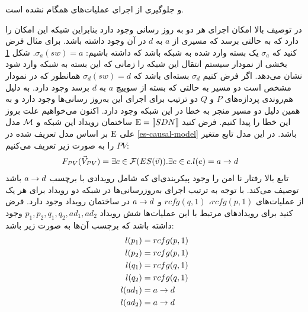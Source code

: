 و جلوگیری از اجرای عملیات‌های همگام نشده است.
\begin{figure}
    \centering
    \caption{}
    \label{fig:blacklist:lts}
\end{figure}
در توصیف بالا امکان اجرای هر دو به روز رسانی وجود دارد
بنابراین شبکه این امکان را دارد که به حالتی برسد که مسیری از 
$a$
به
$d$
در آن وجود داشته باشد.
برای مثال فرض کنید که
$\sigma_a$
یک بسته وارد شده به شبکه باشد که داشته باشیم:
$\sigma_a(sw) = a$.
شکل
\ref{fig:blacklist:lts}
بخشی از نمودار سیستم انتقال این شبکه را زمانی که این بسته به شبکه وارد شود نشان می‌دهد.
اگر فرض کنیم
$\sigma_d$
بسته‌ای باشد که
$\sigma_d(sw) = d$
همانطور که در نمودار مشخص است دو مسیر به حالتی که بسته از سوییچ
$a$
به
$d$
برسد وجود دارد.
به دلیل هم‌روندی پردازه‌های
$P$
و
$Q$
دو ترتیب برای اجرای این به‌روز رسانی‌ها وجود دارد و به همین دلیل دو مسیر منجر به خطا در این شبکه وجود دارد.
اکنون می‌خواهیم علت بروز این خطا را پیدا کنیم.
فرض کنید
$\mathrm{E} = \llbracket SDN \rrbracket$
ساختمان رویداد این شبکه و
$\mathcal{M}$
مدل علی
$\mathrm{E}$
بر اساس مدل تعریف شده در
\ref{es-causal-model}
باشد.
در این مدل تابع متغیر
$PV$
را به صورت زیر تعریف می‌کنیم:
\begin{align*}
    F_{PV}(\vec V_{PV}) & = \exists c \in \mathcal{F}(ES(\vec v)). \exists e \in c. l(e) = a\rightarrow d
\end{align*}
تابع بالا رفتار نا امن را وجود پیکربندی‌ای که شامل رویدادی با برچسب 
$a \rightarrow d$
باشد توصیف می‌کند.
با توجه به ترتیب اجرای به‌روز‌رسانی‌ها در شبکه دو رویداد برای هر یک از عملیات‌های
$rcfg(p,1)$،
$rcfg(q,1)$
و
$a \rightarrow d$
در ساختمان رویداد وجود دارد.
فرض کنید برای رویداد‌های مرتبط با این عملیات‌ها شش رویداد
$p_1,p_2,q_1,q_2,ad_1,ad_2$
وجود داشته باشد که برچسب آن‌ها به صورت زیر باشد:
\begin{align*}
    l(p_1) & = rcfg(p,1) \\
    l(p_2) & = rcfg(p,1) \\
    l(q_1) & = rcfg(q,1) \\
    l(q_2) & = rcfg(q,1) \\
    l(ad_1) & = a \rightarrow d \\
    l(ad_2) & = a \rightarrow d 
\end{align*}

